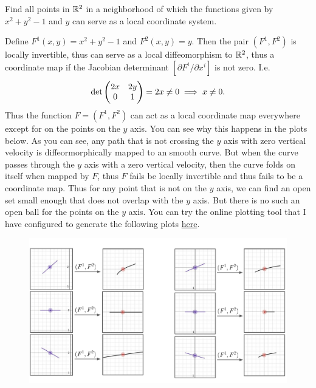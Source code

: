 \begin{problem}[From W. Tu]
	Find all points in $ \mathbb{R}^2 $ in a neighborhood of which the functions given by $ x^2 + y^2 -1  $ and $ y $ can serve as a local coordinate system.
\end{problem}
\begin{solution}
	Define $ F^1(x,y) = x^2 + y^2 -1 $ and $ F^2(x,y) = y  $. Then the pair $ (F^1,F^2) $ is locally invertible, thus can serve as a local diffeomorphism to $ \mathbb{R}^2 $, thus a coordinate map if the Jacobian determinant $ [\partial F^i /\partial x^i] $ is not zero. I.e.
	\[ \det\begin{pmatrix} 2x & 2y \\ 0 & 1 \end{pmatrix} = 2x \neq 0 \implies x \neq 0. \]
	Thus the function $ F = (F^1,F^2) $ can act as a local coordinate map everywhere except for on the points on the $ y $ axis. You can see why this happens in the plots below. As you can see, any path that is not crossing the $ y $ axis with zero vertical velocity is diffeormorphically mapped to an smooth curve. But when the curve passes through the $ y $ axis with a zero vertical velocity, then the curve folds on itself when mapped by $ F $, thus $ F $ fails be locally invertible and thus fails to be a coordinate map. Thus for any point that is not on the $ y $ axis, we can find an open set small enough that does not overlap with the $ y $ axis. But there is no such an open ball for the points on the $ y $ axis.	You can try the online plotting tool that I have configured to generate the following plots \href{https://www.desmos.com/calculator/pam0whmnbs}{here}.
	\begin{figure}[h!]
		\centering
		\includegraphics[width=0.8\linewidth]{Images/diffeomorphismExample}
	\end{figure}
	
\end{solution}

